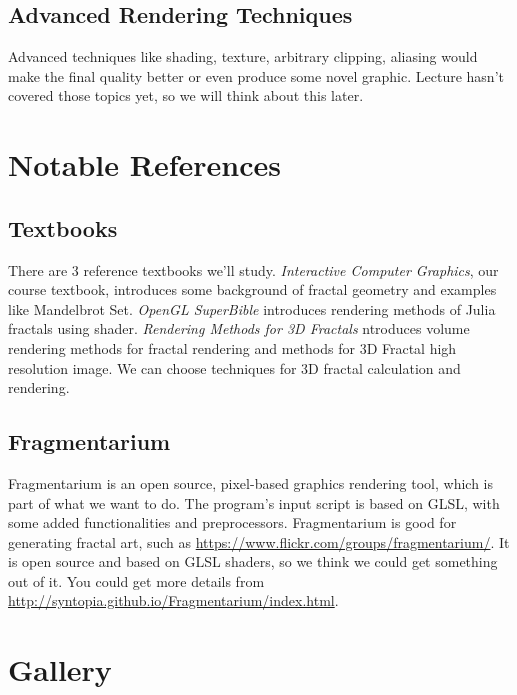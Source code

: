 \documentclass[a4paper]{article}
\begin{document}
\subsection{Advanced Rendering Techniques}
Advanced techniques like shading, texture, arbitrary clipping, aliasing would make the final quality better or even produce some novel graphic.
Lecture hasn't covered those topics yet, so we will think about this later.
\section{Notable References}
\subsection{Textbooks}
There are 3 reference textbooks we'll study.
\textit{Interactive Computer Graphics}\cite{c1}, our course textbook, introduces some background of fractal geometry and examples like Mandelbrot Set.
\textit{OpenGL SuperBible}\cite{c2} introduces rendering methods of Julia fractals using shader.
\textit{Rendering Methods for 3D Fractals}\cite{c3} ntroduces volume rendering methods for fractal rendering and methods for 3D Fractal high resolution image. We can choose techniques for 3D fractal calculation and rendering.

\subsection{Fragmentarium}
Fragmentarium is an open source, pixel-based graphics rendering tool, which is part of what we want to do. The program's input script is based on GLSL, with some added functionalities and preprocessors. Fragmentarium is good for generating fractal art, such as \url{https://www.flickr.com/groups/fragmentarium/}. It is open source and based on GLSL shaders, so we think we could get something out of it. You could get more details from \url{http://syntopia.github.io/Fragmentarium/index.html}.
\section{Gallery}
\begin{figure}[H]
\centering
{}
\end{figure}
\end{document}
